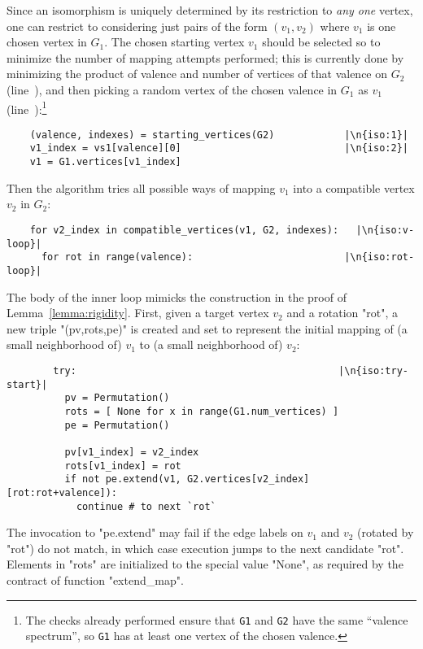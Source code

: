 Since an isomorphism is uniquely determined by its restriction to
\emph{any one} vertex, one can restrict to considering just pairs of
the form $(v_1, v_2)$ where $v_1$ is one chosen vertex in $G_1$.  The
chosen starting vertex $v_1$ should be selected so to minimize the
number of mapping attempts performed; this is currently done by
minimizing the product of valence and number of vertices of that
valence on $G_2$ (line~), and then picking a random vertex
of the chosen valence in $G_1$ as $v_1$
(line~):\footnote{The checks already performed ensure that
  \Verb`G1` and \Verb`G2` have the same ``valence spectrum'', so
  \Verb`G1` has at least one vertex of the chosen valence.}
\begin{lstlisting}
    (valence, indexes) = starting_vertices(G2)            |\n{iso:1}|
    v1_index = vs1[valence][0]                            |\n{iso:2}|
    v1 = G1.vertices[v1_index]
\end{lstlisting}
Then the algorithm tries all possible ways of mapping $v_1$ into a
compatible vertex $v_2$ in $G_2$:
\begin{lstlisting}
    for v2_index in compatible_vertices(v1, G2, indexes):   |\n{iso:v-loop}|
      for rot in range(valence):                          |\n{iso:rot-loop}|
\end{lstlisting}
The body of the inner loop mimicks the construction in the proof
of Lemma~\ref{lemma:rigidity}.  First, given a target vertex $v_2$ and a
rotation "rot", a new triple "(pv,rots,pe)" is created and set to
represent the initial mapping of (a small neighborhood of) $v_1$ to (a
small neighborhood of) $v_2$:
\begin{lstlisting}
        try:                                             |\n{iso:try-start}|
          pv = Permutation()
          rots = [ None for x in range(G1.num_vertices) ]
          pe = Permutation()

          pv[v1_index] = v2_index
          rots[v1_index] = rot
          if not pe.extend(v1, G2.vertices[v2_index][rot:rot+valence]):
            continue # to next `rot`

\end{lstlisting}
The invocation to "pe.extend" may fail if the edge labels on $v_1$ and
$v_2$ (rotated by "rot") do not match, in which case execution jumps to
the next candidate "rot".
Elements in "rots" are initialized to the special value "None", as
required by the contract of function "extend_map".

